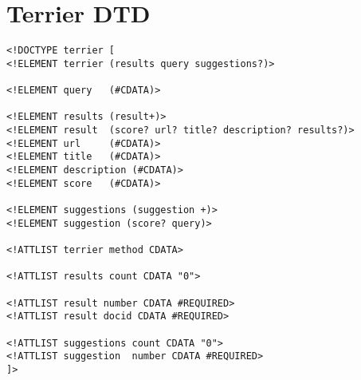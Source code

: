 \chapter{Terrier DTD}\label{terrier_dtd}
\renewcommand{\baselinestretch}{1.0}
\begin{verbatim}
<!DOCTYPE terrier [
<!ELEMENT terrier (results query suggestions?)>

<!ELEMENT query   (#CDATA)>

<!ELEMENT results (result+)>
<!ELEMENT result  (score? url? title? description? results?)>
<!ELEMENT url     (#CDATA)>
<!ELEMENT title   (#CDATA)>
<!ELEMENT description (#CDATA)>
<!ELEMENT score   (#CDATA)>

<!ELEMENT suggestions (suggestion +)>
<!ELEMENT suggestion (score? query)>

<!ATTLIST terrier method CDATA>

<!ATTLIST results count CDATA "0">

<!ATTLIST result number CDATA #REQUIRED>
<!ATTLIST result docid CDATA #REQUIRED>

<!ATTLIST suggestions count CDATA "0">
<!ATTLIST suggestion  number CDATA #REQUIRED>
]>
\end{verbatim}
\renewcommand{\baselinestretch}{1.5}
